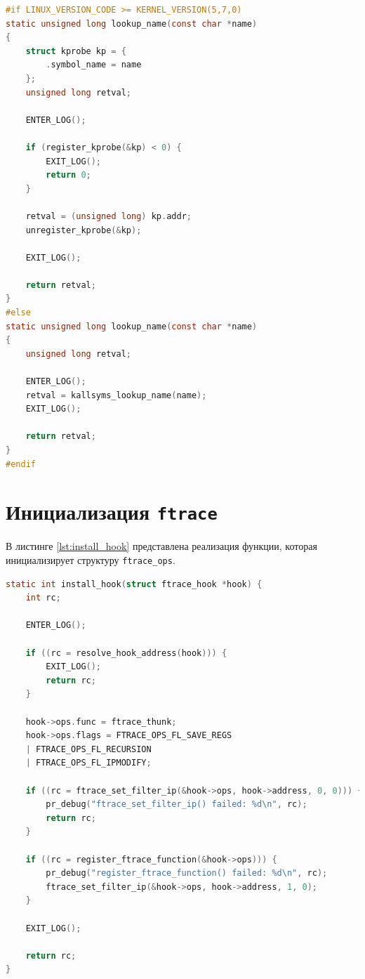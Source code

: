 \begin{lstlisting}[label=lst:lookup_name, caption=Реализация функции \texttt{lookup\_name()}, language=c]
#if LINUX_VERSION_CODE >= KERNEL_VERSION(5,7,0)
static unsigned long lookup_name(const char *name)
{
	struct kprobe kp = {
		.symbol_name = name
	};
	unsigned long retval;
	
	ENTER_LOG();
	
	if (register_kprobe(&kp) < 0) {
		EXIT_LOG();
		return 0;
	}
	
	retval = (unsigned long) kp.addr;
	unregister_kprobe(&kp);
	
	EXIT_LOG();
	
	return retval;
}
#else
static unsigned long lookup_name(const char *name)
{
	unsigned long retval;
	
	ENTER_LOG();
	retval = kallsyms_lookup_name(name);
	EXIT_LOG();
	
	return retval;
}
#endif
\end{lstlisting}

\section{Инициализация \texttt{ftrace}}

В листинге \ref{lst:install_hook} представлена реализация функции, которая инициализирует структуру \texttt{ftrace\_ops}.\\

\begin{lstlisting}[label=lst:install_hook, caption=Реализация функции \texttt{install\_hook()}, language=c]
static int install_hook(struct ftrace_hook *hook) {
	int rc;
	
	ENTER_LOG();
	
	if ((rc = resolve_hook_address(hook))) {
		EXIT_LOG();
		return rc;
	}
	
	hook->ops.func = ftrace_thunk; 
	hook->ops.flags = FTRACE_OPS_FL_SAVE_REGS
	| FTRACE_OPS_FL_RECURSION
	| FTRACE_OPS_FL_IPMODIFY;
	
	if ((rc = ftrace_set_filter_ip(&hook->ops, hook->address, 0, 0))) {
		pr_debug("ftrace_set_filter_ip() failed: %d\n", rc);
		return rc;
	}
	
	if ((rc = register_ftrace_function(&hook->ops))) {
		pr_debug("register_ftrace_function() failed: %d\n", rc);
		ftrace_set_filter_ip(&hook->ops, hook->address, 1, 0);
	}
	
	EXIT_LOG();
	
	return rc;
}
\end{lstlisting}

